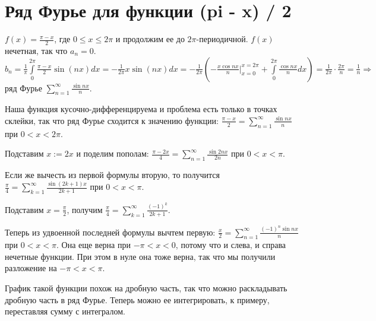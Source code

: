 \section{Ряд Фурье для функции (pi - x) / 2}


\begin{example}
    $f(x) = \frac{\pi - x}{2}$, где $0 \le x \le 2 \pi$ и продолжим ее до $2 \pi$-периодичной.
    $f(x)$ нечетная, так что $a_n = 0$.
    $b_n = \frac{1}{\pi} \int \limits_{0}^{2 \pi} \frac{\pi - x}{2} \sin (nx) dx = -\frac{1}{2 \pi} x \sin (nx) dx =
        -\frac{1}{2 \pi} (-\frac{x \cos nx}{n} \bigr|_{x = 0}^{x = 2 \pi} + \int \limits_{0}^{2 \pi} \frac{\cos nx}{n} dx) = \frac{1}{2 \pi} \cdot \frac{2 \pi}{n} = \frac{1}{n} \Rightarrow$ ряд Фурье $\sum \limits_{n = 1}^{\infty} \frac{\sin nx}{n}$.

    Наша функция кусочно-дифференцируема и проблема есть только в точках склейки, так что ряд Фурье сходится к значению функции:
    $\frac{\pi - x}{2} = \sum \limits_{n = 1}^{\infty} \frac{\sin nx}{n}$ при $0 < x < 2 \pi$.

    Подставим $x := 2x$ и поделим пополам:
    $\frac{\pi - 2x}{4} = \sum \limits_{n = 1}^{\infty} \frac{\sin 2nx}{2n}$ при $0 < x < \pi$.

    Если же вычесть из первой формулы вторую, то получится
    $\frac{\pi}{4} = \sum \limits_{k = 1}^{\infty} \frac{\sin (2k + 1) x}{2k + 1}$ при $0 < x < \pi$.

    Подставим $x = \frac{\pi}{2}$, получим
    $\frac{\pi}{4} = \sum \limits_{k = 1}^{\infty}\frac{(-1)^k}{2k + 1}$.

    Теперь из удвоенной последней формулы вычтем первую:
    $\frac{x}{2} = \sum \limits_{n = 1}^{\infty}\frac{(-1)^n \sin nx}{n}$ при $0 < x < \pi$.
    Она еще верна при $-\pi < x < 0$, потому что и слева, и справа нечетные функции. При этом в нуле она тоже верна, так что мы получили разложение на $-\pi < x < \pi$.

    График такой функции похож на дробную часть, так что можно раскладывать дробную часть в ряд Фурье. Теперь можно ее интегрировать, к примеру, переставляя сумму с интегралом.
\end{example}



\newpage

